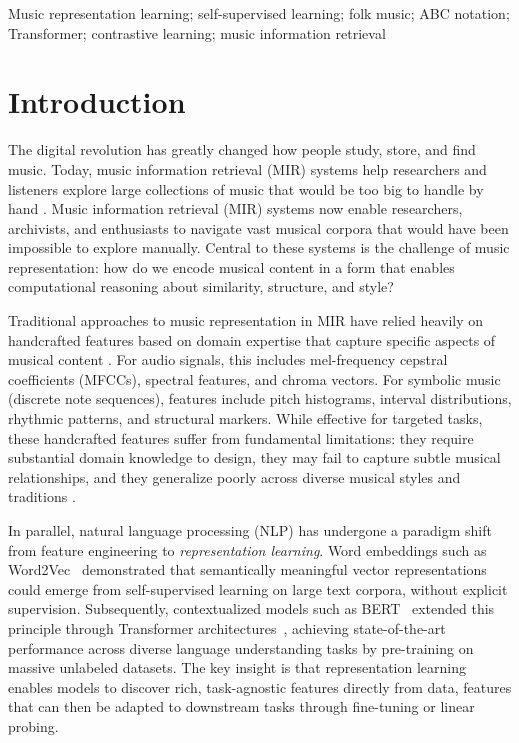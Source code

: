 \documentclass[]{interact}
\theoremstyle{plain}
\theoremstyle{definition}
\theoremstyle{remark}
\begin{document}
\begin{keywords}
Music representation learning; self-supervised learning; folk music; ABC notation; Transformer; contrastive learning; music information retrieval
\end{keywords}

\section{Introduction}

The digital revolution has greatly changed how people study, store, and find music. Today, music information retrieval (MIR) systems help researchers and listeners explore large collections of music that would be too big to handle by hand \cite{li2012music, typke2021survey}. Music information retrieval (MIR) systems now enable researchers, archivists, and enthusiasts to navigate vast musical corpora that would have been impossible to explore manually. Central to these systems is the challenge of music representation: how do we encode musical content in a form that enables computational reasoning about similarity, structure, and style?

Traditional approaches to music representation in MIR have relied heavily on handcrafted features based on domain expertise that capture specific aspects of musical content \cite{pereira2019representation,da2023robust, gupta2013feature}. For audio signals, this includes mel-frequency cepstral coefficients (MFCCs), spectral features, and chroma vectors. For symbolic music (discrete note sequences), features include pitch histograms, interval distributions, rhythmic patterns, and structural markers. While effective for targeted tasks, these handcrafted features suffer from fundamental limitations: they require substantial domain knowledge to design, they may fail to capture subtle musical relationships, and they generalize poorly across diverse musical styles and traditions \cite{humphrey2012moving,pereira2019representation}.

In parallel, natural language processing (NLP) has undergone a paradigm shift from feature engineering to \textit{representation learning}. Word embeddings such as Word2Vec~\cite{Word2Vec2013} demonstrated that semantically meaningful vector representations could emerge from self-supervised learning on large text corpora, without explicit supervision. Subsequently, contextualized models such as BERT~\cite{BERT2019} extended this principle through Transformer architectures~\cite{Transformer2017}, achieving state-of-the-art performance across diverse language understanding tasks by pre-training on massive unlabeled datasets. The key insight is that representation learning enables models to discover rich, task-agnostic features directly from data, features that can then be adapted to downstream tasks through fine-tuning or linear probing.
\end{document}
